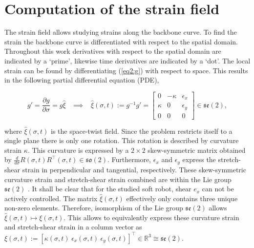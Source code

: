 \section{Computation of the strain field}

The strain field allows studying strains along the backbone curve. To find the strain the backbone curve is differentiated with respect to the spatial domain. Throughout this work derivatives with respect to the spatial domain are indicated by a `prime', likewise time derivatives are indicated by a `dot'. The local strain can be found by differentiating (\ref{eq2:g}) with respect to space. This results in the following partial differential equation (PDE), 

\begin{equation}
   g' = \frac{\partial g}{\partial \sigma} = g \hat{\xi} \hspace{10pt} \implies \hspace{10pt}  \hat{\xi}(\sigma,t) := g^{-1}g' = \begin{bmatrix} 0 & -\kappa & \epsilon_x  \\ \kappa & 0 & \epsilon_y \\ 0 & 0 & 0 \end{bmatrix} \in  \mathfrak{se}(2),
    \label{eq2:dgdsigma}
\end{equation}

where $\hat{\xi}(\sigma,t)$ is the space-twist field. Since the problem restricts itself to a single plane there is only one rotation. This rotation is described by curvature strain $\kappa$. This curvature is expressed by a $2 \times 2$ skew-symmetric matrix obtained by $\frac{d}{d\sigma}R(\sigma,t)R^\top(\sigma,t) \in \mathfrak{so}(2)$. Furthermore, $\epsilon_x$ and $\epsilon_y$ express the stretch-shear strain in perpendicular and tangential, respectively. These skew-symmetric curvature strain and stretch-shear strain combined are within the Lie group $\mathfrak{se}(2)$ \cite{Sola2018}. It shall be clear that for the studied soft robot, shear $e_x$ can not be actively controlled. The matrix $\hat{\xi}(\sigma,t)$ effectively only contains three unique non-zero elements. Therefore, isomorphism of the Lie group $\mathfrak{se}(2)$ allows $\hat{\xi}(\sigma,t) \longmapsto \xi(\sigma,t)$. This allows to equivalently express these curvature strain and stretch-shear strain in a column vector as $\xi(\sigma,t):= [\kappa(\sigma,t) \hspace{3pt} \epsilon_x(\sigma,t) \hspace{3pt} \epsilon_y(\sigma,t) ]^\top \in \mathbb{R}^3 \cong \mathfrak{se}(2)$.

